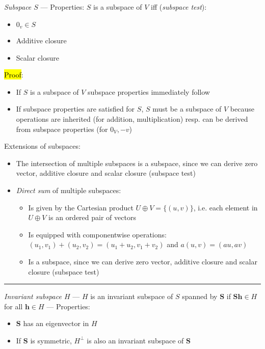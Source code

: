 \emph{Subspace $S$} --- Properties:
$S$ is a subspace of $V$ iff (\emph{subspace test}):
\begin{multicols}{2}
\begin{itemize}
    \item $0_v \in S$
    \item Additive closure
    \item Scalar closure
\end{itemize}
\end{multicols}
\hl{Proof}:
\begin{itemize}
    \item If $S$ is a subspace of $V$ subspace properties immediately follow
    \item If subspace properties are satisfied for $S$, $S$  must be a subspace of $V$ because operations are inherited (for addition, multiplication) resp. can be derived from subspace properties (for $0_V, -v$)
\end{itemize}
Extensions of subspaces:
\begin{itemize}
    \item The intersection of multiple subspaces is a subspace, since we can derive zero vector, additive closure and scalar closure (subspace test)
    \item \emph{Direct sum} of multiple subspaces:
    \begin{itemize}
        \item Is given by the Cartesian product $U \oplus V = \{ (u,v) \}$, i.e. each element in $U \oplus V$ is an ordered pair of vectors
        \item Is equipped with componentwise operations: $(u_1,v_1) + (u_2,v_2) = (u_1+u_2,v_1+v_2)$ and $a(u,v) = (au, av)$
        \item Is a subspace, since we can derive zero vector, additive closure and scalar closure (subspace test)
    \end{itemize}
\end{itemize}

{\color{lightgray}\hrule height 0.001mm}

\emph{Invariant subspace $H$} --- $H$ is an invariant subspace of $S$ spanned by $\boldsymbol{S}$ if $\boldsymbol{S}\boldsymbol{h} \in H$ for all $\boldsymbol{h} \in H$ --- Properties:
\begin{itemize}
    \item $\boldsymbol{S}$ has an eigenvector in $H$
    \item If $\boldsymbol{S}$ is symmetric, $H^\bot$ is also an invariant subspace of $\boldsymbol{S}$
\end{itemize}


